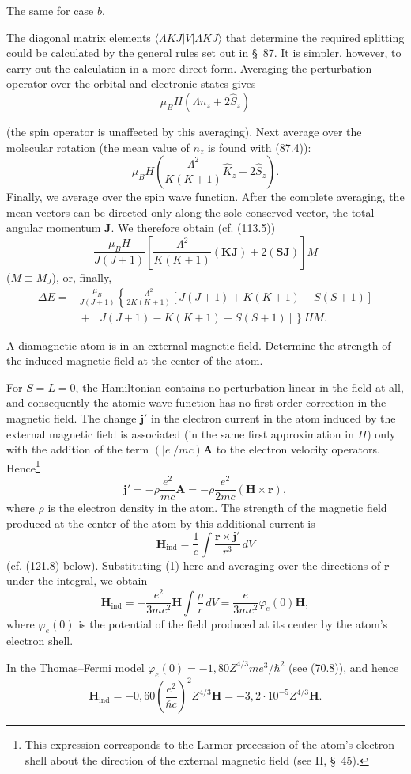  The same for case $b$.

\SolutionHeading The diagonal matrix elements $\langle\Lambda KJ|V|\Lambda KJ\rangle$ that determine the required splitting could be calculated by the general rules set out in §~87. It is simpler, however, to carry out the calculation in a more direct form. Averaging the perturbation operator over the orbital and electronic states gives
\[
 \mu_BH(\Lambda n_z+2\hat S_z)
\]

(the spin operator is unaffected by this averaging). Next average over the molecular rotation (the mean value of $n_z$ is found with (87.4)):
\[
 \mu_BH\left(\frac{\Lambda^2}{K(K+1)}\hat K_z+2\hat S_z\right).
\]
Finally, we average over the spin wave function. After the complete averaging, the mean vectors can be directed only along the sole conserved vector, the total angular momentum $\mathbf J$. We therefore obtain (cf. (113.5))
\[
 \frac{\mu_BH}{J(J+1)}\left[\frac{\Lambda^2}{K(K+1)}(\mathbf K\mathbf J)+2(\mathbf S\mathbf J)\right]M
\]
($M\equiv M_J$), or, finally,
\[
 \begin{split}
 \Delta E={}&\frac{\mu_B}{J(J+1)}\left\{\frac{\Lambda^2}{2K(K+1)}
 [J(J+1)+K(K+1)-S(S+1)]\right.\\
 &\left.{}+[J(J+1)-K(K+1)+S(S+1)]\right\}HM.
 \end{split}
\]

 A diamagnetic atom is in an external magnetic field. Determine the strength of the induced magnetic field at the center of the atom.

\SolutionHeading For $S=L=0$, the Hamiltonian contains no perturbation linear in the field at all, and consequently the atomic wave function has no first-order correction in the magnetic field. The change $\mathbf j'$ in the electron current in the atom induced by the external magnetic field is associated (in the same first approximation in $H$) only with the addition of the term $(|e|/mc)\mathbf A$ to the electron velocity operators. Hence\footnote{This expression corresponds to the Larmor precession of the atom's electron shell about the direction of the external magnetic field (see II, §~45).}
\begin{equation}
 \mathbf j'=-\rho\frac{e^2}{mc}\mathbf A=-\rho\frac{e^2}{2mc}(\mathbf H\times\mathbf r),
 \tag{1}
\end{equation}
where $\rho$ is the electron density in the atom. The strength of the magnetic field produced at the center of the atom by this additional current is
\[
 \mathbf H_{\text{ind}}=\frac1c\int\frac{\mathbf r\times\mathbf j'}{r^3}\,dV
\]
(cf. (121.8) below). Substituting (1) here and averaging over the directions of $\mathbf r$ under the integral, we obtain
\begin{equation}
 \mathbf H_{\text{ind}}=-\frac{e^2}{3mc^2}\mathbf H\int\frac\rho r\,dV=\frac{e}{3mc^2}\varphi_e(0)\mathbf H,
 \tag{2}
\end{equation}
where $\varphi_e(0)$ is the potential of the field produced at its center by the atom's electron shell.

In the Thomas--Fermi model $\varphi_e(0)=-1{,}80Z^{4/3}me^3/\hbar^2$ (see (70.8)), and hence
\[
 \mathbf H_{\text{ind}}=-0{,}60\left(\frac{e^2}{\hbar c}\right)^2Z^{4/3}\mathbf H=-3{,}2\cdot10^{-5}Z^{4/3}\mathbf H.
\]

